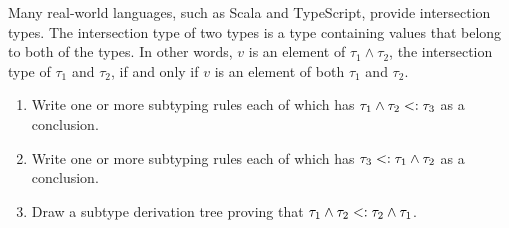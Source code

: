 \begin{exercise}

Many real-world languages, such as Scala and TypeScript, provide
intersection types. The intersection type of two types is a type containing values that
belong to both of the types. In other words, $v$ is an element of
$\tau_1\land\tau_2$, the intersection type of $\tau_1$ and $\tau_2$, if and only
if $v$ is an element of both $\tau_1$ and $\tau_2$.

\begin{enumerate}
  \item Write one or more subtyping rules each of which has
    $\tau_1\land\tau_2<:\tau_3$ as a conclusion.
  \item Write one or more subtyping rules each of which has
    $\tau_3<:\tau_1\land\tau_2$ as a conclusion.
  \item Draw a subtype derivation tree proving that
    $\tau_1\land\tau_2<:\tau_2\land\tau_1$.
\end{enumerate}

\end{exercise}

